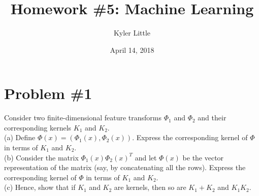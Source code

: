 \documentclass[12pt]{article}
\author{Kyler Little\vspace{-0.6cm}}
\title{Homework \#5: Machine Learning\vspace{-0.3cm}}
\date{April 14, 2018\vspace{-0.7cm}}
\begin{document}
	\maketitle
	\section*{Problem \#1}
	Consider two finite-dimensional feature transforms $\Phi_1$ and $\Phi_2$ and their corresponding kernels $K_1$ and $K_2$. \\
	(a) Define $\Phi(x) = (\Phi_1(x), \Phi_2(x))$. Express the corresponding kernel of $\Phi$ in terms of $K_1$ and $K_2$. \\
	(b) Consider the matrix $\Phi_1(x) \Phi_2(x)^T$ and let $\Phi(x)$ be the vector representation of the matrix (say, by concatenating all the rows). Express the corresponding kernel of $\Phi$ in terms of $K_1$ and $K_2$. \\
	(c) Hence, show that if $K_1$ and $K_2$ are kernels, then so are $K_1 + K_2$ and $K_1 K_2$.
	
\end{document}
